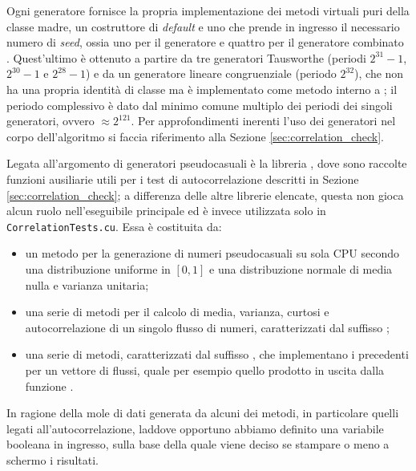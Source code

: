 Ogni generatore fornisce la propria implementazione dei metodi virtuali puri della classe madre, un costruttore di \textit{default} e uno che prende in ingresso il necessario numero di \textit{seed}, ossia uno per il generatore  e quattro per il generatore combinato . Quest'ultimo è ottenuto a partire da tre generatori Tausworthe (periodi $2^{31}-1$, $2^{30}-1$ e $2^{28}-1$) e da un generatore lineare congruenziale (periodo $2^{32}$), che non ha una propria identità di classe ma è implementato come metodo interno a ; il periodo complessivo è dato dal minimo comune multiplo dei periodi dei singoli generatori, ovvero $\approx 2^{121}$. Per approfondimenti inerenti l'uso dei generatori nel corpo dell'algoritmo si faccia riferimento alla Sezione \ref{sec:correlation_check}.

Legata all'argomento di generatori pseudocasuali è la libreria , dove sono raccolte funzioni ausiliarie utili per i test di autocorrelazione descritti in Sezione \ref{sec:correlation_check}; a differenza delle altre librerie elencate, questa non gioca alcun ruolo nell'eseguibile principale ed è invece utilizzata solo in \verb|CorrelationTests.cu|. Essa è costituita da:
\begin{itemize}
    \item un metodo  per la generazione di numeri pseudocasuali su sola CPU secondo una distribuzione uniforme in $[0,1]$ e una distribuzione normale di media nulla e varianza unitaria;
    \item una serie di metodi per il calcolo di media, varianza, curtosi e autocorrelazione di un singolo flusso di numeri, caratterizzati dal suffisso ;
    \item una serie di metodi, caratterizzati dal suffisso , che implementano i precedenti per un vettore di flussi, quale per esempio quello prodotto in uscita dalla funzione .
\end{itemize}

In ragione della mole di dati generata da alcuni dei metodi, in particolare quelli legati all'autocorrelazione, laddove opportuno abbiamo definito una variabile booleana  in ingresso, sulla base della quale viene deciso se stampare o meno a schermo i risultati.

